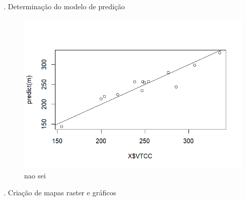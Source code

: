 \documentclass[
]{article}
\begin{document}
. Determinação do modelo de predição

\begin{figure}

{\centering \includegraphics[width=0.5\linewidth]{IMAGES/analise-de-regressao} 

}

\caption{nao sei}\label{fig:unnamed-chunk-17}
\end{figure}

. Criação de mapas raster e gráficos \newpage
\end{document}
